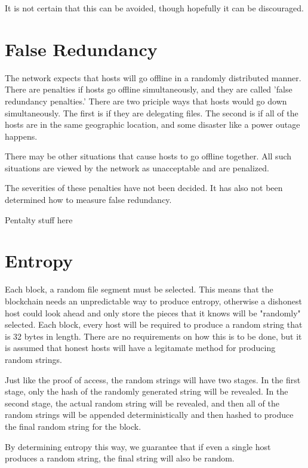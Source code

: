 \documentclass[twocolumn]{article}
\begin{document}
It is not certain that this can be avoided, though hopefully it can be discouraged.

\section{False Redundancy}

The network expects that hosts will go offline in a randomly distributed manner.
There are penalties if hosts go offline simultaneously, and they are called 'false redundancy penalties.'
There are two priciple ways that hosts would go down simultaneously.
The first is if they are delegating files.
The second is if all of the hosts are in the same geographic location, and some disaster like a power outage happens.

There may be other situations that cause hosts to go offline together.
All such situations are viewed by the network as unacceptable and are penalized.

The severities of these penalties have not been decided.
It has also not been determined how to measure false redundancy.

\begin{center}
Pentalty stuff here
\end{center}

\section{Entropy}

Each block, a random file segment must be selected.
This means that the blockchain needs an unpredictable way to produce entropy, otherwise a dishonest host could look ahead and only store the pieces that it knows will be "randomly" selected.
Each block, every host will be required to produce a random string that is 32 bytes in length.
There are no requirements on how this is to be done, but it is assumed that honest hosts will have a legitamate method for producing random strings.

Just like the proof of access, the random strings will have two stages.
In the first stage, only the hash of the randomly generated string will be revealed.
In the second stage, the actual random string will be revealed, and then all of the random strings will be appended deterministically and then hashed to produce the final random string for the block.

By determining entropy this way, we guarantee that if even a single host produces a random string, the final string will also be random.
\end{document}

